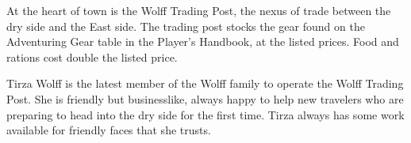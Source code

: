 At the heart of town is the Wolff Trading Post, the nexus of trade between the dry side and the East side.
The trading post stocks the gear found on the Adventuring Gear table in the Player's Handbook, at the listed prices.
Food and rations cost double the listed price.

Tirza Wolff is the latest member of the Wolff family to operate the Wolff Trading Post.
She is friendly but businesslike, always happy to help new travelers who are preparing to head into the dry side for the first time.
Tirza always has some work available for friendly faces that she trusts.
